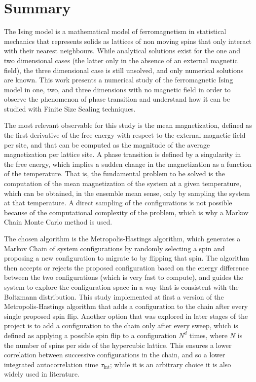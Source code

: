 \documentclass[11pt,a4paper]{article}
\begin{document}
\section*{Summary}

The Ising model is a mathematical model of ferromagnetism in statistical mechanics that represents solids as lattices of non moving spins that only interact with their nearest neighbours. While analytical solutions exist for the one and two dimensional cases (the latter only in the absence of an external magnetic field), the three dimensional case is still unsolved, and only numerical solutions are known. This work presents a numerical study of the ferromagnetic Ising model in one, two, and three dimensions with no magnetic field in order to observe the phenomenon of phase transition and understand how it can be studied with Finite Size Scaling techniques.

The most relevant observable for this study is the mean magnetization, defined as the first derivative of the free energy with respect to the external magnetic field per site, and that can be computed as the magnitude of the average magnetization per lattice site. A phase transition is defined by a singularity in the free energy, which implies a sudden change in the magnetization as a function of the temperature. That is, the fundamental problem to be solved is the computation of the mean magnetization of the system at a given temperature, which can be obtained, in the ensemble mean sense, only by sampling the system at that temperature. A direct sampling of the configurations is not possible because of the computational complexity of the problem, which is why a Markov Chain Monte Carlo method is used.

The chosen algorithm is the Metropolis-Hastings algorithm, which generates a Markov Chain of system configurations by randomly selecting a spin and proposing a new configuration to migrate to by flipping that spin. The algorithm then accepts or rejects the proposed configuration based on the energy difference between the two configurations (which is very fast to compute), and guides the system to explore the configuration space in a way that is consistent with the Boltzmann distribution. This study implemented at first a version of the Metropolis-Hastings algorithm that adds a configuration to the chain after every single proposed spin flip. Another option that was explored in later stages of the project is to add a configuration to the chain only after every sweep, which is defined as applying a possible spin flip to a configuration $N^d$ times, where $N$ is the number of spins per side of the hypercubic lattice. This ensures a lower correlation between successive configurations in the chain, and so a lower integrated autocorrelation time $\tau_{\text{int}}$; while it is an arbitrary choice it is also widely used in literature.
\end{document}
